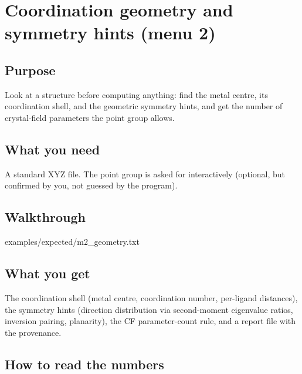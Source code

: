 \chapter{Coordination geometry and symmetry hints (menu 2)}
\label{ch:menu2}

\section{Purpose}

Look at a structure before computing anything: find the metal centre, its
coordination shell, and the geometric symmetry hints, and get the number of
crystal-field parameters the point group allows.

\section{What you need}

A standard XYZ file. The point group is asked for interactively (optional, but
confirmed by you, not guessed by the program).

\section{Walkthrough}


  {examples/expected/m2_geometry.txt}

\section{What you get}

The coordination shell (metal centre, coordination number, per-ligand
distances), the symmetry hints (direction distribution via second-moment
eigenvalue ratios, inversion pairing, planarity), the CF parameter-count rule,
and a report file  with the provenance.

\section{How to read the numbers}

